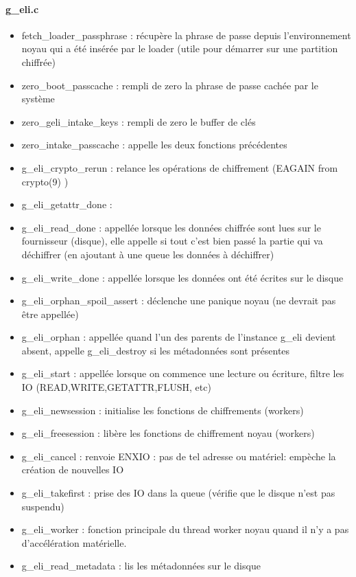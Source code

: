 \paragraph{g\_eli.c}
\begin{itemize}
	\item fetch\_loader\_passphrase : récupère la phrase de passe depuis 
		l'environnement noyau qui a été insérée par le loader 
		(utile pour démarrer sur une partition chiffrée)
	\item zero\_boot\_passcache : rempli de zero la phrase de passe cachée par le 
		système
	\item zero\_geli\_intake\_keys : rempli de zero le buffer de clés
	\item zero\_intake\_passcache : appelle les deux fonctions précédentes
	\item g\_eli\_crypto\_rerun : relance les opérations de chiffrement (EAGAIN from
		crypto(9) )
	\item g\_eli\_getattr\_done : 
	\item g\_eli\_read\_done : appellée lorsque les données chiffrée sont lues sur le 
		fournisseur (disque), elle appelle si tout c'est bien passé la partie
		qui va déchiffrer (en ajoutant à une queue les données à déchiffrer)
	\item g\_eli\_write\_done : appellée lorsque les données ont été écrites sur le 
		disque
	\item g\_eli\_orphan\_spoil\_assert : déclenche une panique noyau (ne devrait pas
		être appellée)
	\item g\_eli\_orphan : appellée quand l'un des parents de l'instance g\_eli 
		devient absent, appelle g\_eli\_destroy si les métadonnées sont présentes
	\item g\_eli\_start : appellée lorsque on commence une lecture ou écriture, 
		filtre les IO (READ,WRITE,GETATTR,FLUSH, etc)
	\item g\_eli\_newsession : initialise les fonctions de chiffrements (workers)
	\item g\_eli\_freesession : libère les fonctions de chiffrement noyau (workers)
	\item g\_eli\_cancel : renvoie ENXIO : pas de tel adresse ou matériel: empèche
		la création de nouvelles IO
	\item g\_eli\_takefirst : prise des IO dans la queue (vérifie que le disque n'est
		pas suspendu)
	\item g\_eli\_worker : fonction principale du thread worker noyau quand il n'y a
		pas d'accélération matérielle.
	\item g\_eli\_read\_metadata : lis les métadonnées sur le disque

\end{itemize}
